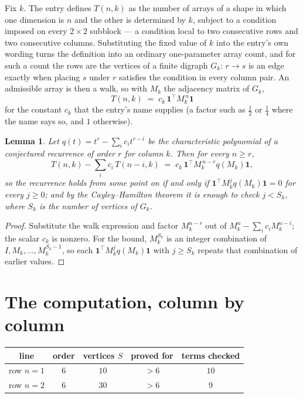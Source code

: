 \documentclass[11pt,a4paper]{article}
\theoremstyle{plain}
\newtheorem{lemma}[theorem]{Lemma}
\theoremstyle{definition}
\begin{document}
Fix $k$. The entry defines $T(n,k)$ as the number of arrays of a shape in which one dimension
is $n$ and the other is determined by $k$, subject to a condition imposed on every
$2\times2$ subblock --- a condition local to two consecutive rows and two consecutive columns.
Substituting the fixed value of $k$ into the entry's own wording turns the definition into an
ordinary one-parameter array count, and for such a count the rows are the vertices of a finite
digraph $G_k$: $r\to s$ is an edge exactly when placing $s$ under $r$ satisfies the condition
in every column pair. An admissible array is then a walk, so with $M_k$ the adjacency matrix
of $G_k$,
\[
T(n,k)\;=\;c_k\,\mathbf{1}^{\!\top}M_k^{\,n}\mathbf{1}
\]
for the constant $c_k$ that the entry's name supplies (a factor such as $\tfrac12$ or
$\tfrac14$ where the name says so, and $1$ otherwise).

\begin{lemma}\label{lem:crit}
Let $q(t)=t^{r}-\sum_i c_it^{r-i}$ be the characteristic polynomial of a conjectured
recurrence of order $r$ for column $k$. Then for every $n\ge r$,
\[
T(n,k)-\sum_i c_i\,T(n-i,k)\;=\;c_k\,\mathbf{1}^{\!\top}M_k^{\,n-r}q(M_k)\mathbf{1},
\]
so the recurrence holds from some point on if and only if
$\mathbf{1}^{\!\top}M_k^{j}q(M_k)\mathbf{1}=0$ for every $j\ge0$; and by the
Cayley--Hamilton theorem it is enough to check $j<S_k$, where $S_k$ is the number of vertices
of $G_k$.
\end{lemma}

\begin{proof}
Substitute the walk expression and factor $M_k^{n-r}$ out of $M_k^{n}-\sum_ic_iM_k^{n-i}$;
the scalar $c_k$ is nonzero. For the bound, $M_k^{S_k}$ is an integer combination of
$I,M_k,\dots,M_k^{S_k-1}$, so each $\mathbf{1}^{\!\top}M_k^{j}q(M_k)\mathbf{1}$ with
$j\ge S_k$ repeats that combination of earlier values.
\end{proof}

\section{The computation, column by column}

\begin{center}
\begin{tabular}{ccccc}
line & order & vertices $S$ & proved for & terms checked \\ \hline
row $n$$=1$ & $6$ & $10$ & $>6$ & $10$ \\
row $n$$=2$ & $6$ & $30$ & $>6$ & $9$ \\
\end{tabular}
\end{center}
\end{document}
